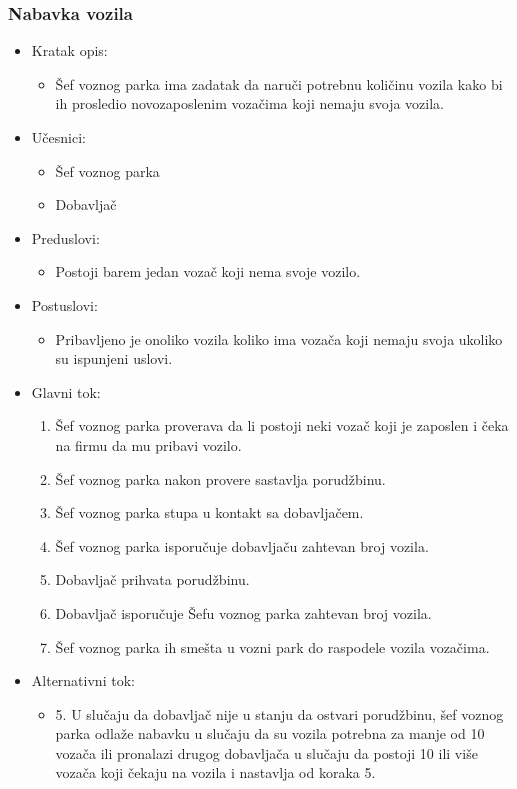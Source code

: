 \subsubsection{\bfseries Nabavka vozila}
\begin{itemize}
	\item Kratak opis:
		\begin{itemize}
			\item Šef voznog parka ima zadatak da naruči potrebnu količinu vozila kako bi ih prosledio novozaposlenim vozačima koji nemaju svoja vozila.
		\end{itemize}

	\item Učesnici:
		\begin{itemize}
		    \item Šef voznog parka
			\item Dobavljač
		\end{itemize}


	\item Preduslovi:
		\begin{itemize}
		    \item Postoji barem jedan vozač koji nema svoje vozilo.
		\end{itemize}


	\item Postuslovi:
		\begin{itemize}
			\item Pribavljeno je onoliko vozila koliko ima vozača koji nemaju svoja ukoliko su ispunjeni uslovi.
	\end{itemize}

	\item Glavni tok:
		\begin{enumerate}
		    \item Šef voznog parka proverava da li postoji neki vozač koji je zaposlen i čeka na firmu da mu pribavi vozilo.
		    \item Šef voznog parka nakon provere sastavlja porudžbinu.
		    \item Šef voznog parka stupa u kontakt sa dobavljačem.
			\item Šef voznog parka isporučuje dobavljaču zahtevan broj vozila.
			\item Dobavljač prihvata porudžbinu.
			\item Dobavljač isporučuje Šefu voznog parka zahtevan broj vozila.
			\item Šef voznog parka ih smešta u vozni park do raspodele vozila vozačima.
		\end{enumerate}

	\item Alternativni tok:
		\begin{itemize}
		    \item 5. U slučaju da dobavljač nije u stanju da ostvari porudžbinu, šef voznog parka odlaže nabavku u slučaju da su vozila potrebna za manje od 10 vozača ili pronalazi drugog dobavljača u slučaju da postoji 10 ili više vozača koji čekaju na vozila i nastavlja od koraka 5.
		\end{itemize}

\end{itemize}

